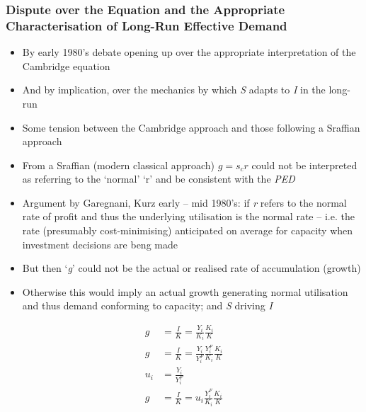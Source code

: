 \documentclass{article}
\begin{document}
\subsubsection{Dispute over the Equation and the Appropriate Characterisation of Long-Run Effective Demand}
	\begin{itemize}
		\item By early 1980's debate opening up over the appropriate interpretation of the Cambridge equation
		\item And by implication, over the mechanics by which \textit{S} adapts to \textit{I} in the long-run
		\item Some tension between the Cambridge approach and those following a Sraffian approach
		\item From a Sraffian (modern classical approach) \(g = s_cr\)  could not be interpreted as referring to the `normal' `r' and be consistent with the \textit{PED}
		\item Argument by Garegnani, Kurz early -- mid 1980's: if \textit{r} refers to the normal rate of profit and thus the underlying utilisation is the normal rate -- i.e. the rate (presumably cost-minimising) anticipated on average for capacity when investment decisions are beng made
		\item But then `\textit{g}' could not be the actual or realised rate of accumulation (growth)
		\item Otherwise this would imply an actual growth generating normal utilisation and thus demand conforming to capacity; and \textit{S} driving \textit{I}
	\end{itemize}
	\begin{align*}
		g &= \frac{I}{K} = \frac{Y_i}{K_i}\frac{K_i}{K}\\
		g &= \frac{I}{K} = \frac{Y_i}{Y_i^F}\frac{Y_i^F}{K_i}\frac{K_i}{K}\\
		u_i &= \frac{Y_i}{Y_i^F}\\
		g &= \frac{I}{K} = u_i \frac{Y_i^F}{K_i}\frac{K_i}{K}
	\end{align*}
\end{document}
